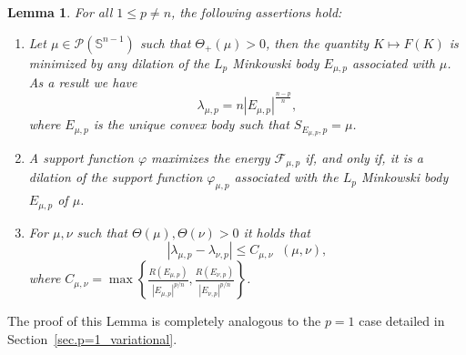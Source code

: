 \documentclass[a4paper, 10pt, twoside]{amsart}
\numberwithin{equation}{section}
\newcommand{\lemmname}{Lemma}
\theoremstyle{plain}
\newtheorem{lemma}[theorem]{\lemmname}
\theoremstyle{definition}
\DeclareMathOperator{\dc}{\mathrm{d}_\mathrm{C}}
\begin{document}
\begin{lemma}\label{lemma.variational_problem_Lp}
    For all $1\le p \neq n$, the following assertions hold: 
    \begin{enumerate}
        \item Let $\mu \in \mathscr{P}(\mathbb{S}^{n-1})$ such that $\Theta_+(\mu) > 0$, then the quantity $K \mapsto F(K)$ is minimized by any dilation of the $L_p$ Minkowski body $E_{\mu,p}$ associated with $\mu$. As a result we have 
        \[
            \lambda_{\mu,p} = n {|E_{\mu,p}|}^{\frac{n-p}{n}}, 
        \]
        where $E_{\mu,p}$ is the unique convex body such that $S_{E_{\mu,p} , p} = \mu$.
        \item A support function $\varphi$ maximizes the energy $\mathscr{F}_{\mu,p}$ if, and only if, it is a dilation of the support function $\varphi_{\mu,p}$ associated with the $L_p$ Minkowski body $E_{\mu,p}$ of $\mu$. 
        \item For $\mu,\nu$ such that $\Theta(\mu),\Theta(\nu) > 0$ it holds that 
        \[
            |\lambda_{\mu,p} - \lambda_{\nu,p}| 
            \le 
            C_{\mu,\nu} \dc(\mu,\nu),
        \]
        where $C_{\mu,\nu} =  \max\left\{\frac{R(E_{\mu,p})}{|E_{\mu,p}|^{p/n}}, \frac{R(E_{\nu,p})}{|E_{\nu,p}|^{p/n}}  \right\}$. 
    \end{enumerate}
\end{lemma}
The proof of this Lemma is completely analogous to the $p=1$ case detailed in Section~\ref{sec.p=1_variational}.
\end{document}
